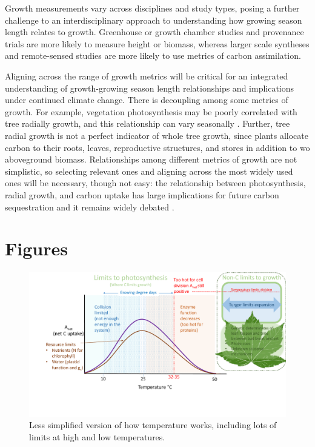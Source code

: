 \documentclass[11pt]{article}
\begin{document}
Growth measurements vary across disciplines and study types, posing a further challenge to an interdisciplinary approach to understanding how growing season length relates to growth. Greenhouse or growth chamber studies and provenance trials are more likely to measure height or biomass, whereas larger scale syntheses and remote-sensed studies are more likely to use metrics of carbon assimilation. 

Aligning across the range of growth metrics will be critical for an integrated understanding of growth-growing season length relationships and implications under continued climate change.  There is decoupling among some metrics of growth. For example, vegetation photosynthesis may be poorly correlated with tree radially growth, and this relationship can vary seasonally \citep{cabon2022cross}. Further, tree radial growth is not a perfect indicator of whole tree growth, since plants allocate
carbon to their roots, leaves, reproductive structures, and stores in addition to wo aboveground biomass. Relationships among different metrics of growth are not simplistic, so selecting relevant ones and aligning across the most widely used ones will be necessary, though not easy: the relationship  between photosynthesis, radial growth, and carbon uptake has large implications for future carbon sequestration and it remains widely debated \citep{green2022limits}.


\newpage
\section{Figures}
\begin{figure}[h!]
\includegraphics[width=1\textwidth]{..//figures/grephonfig.pdf}
\caption{Less simplified version of how temperature works, including lots of limits at high and low temperatures.}
\label{fig:temperaturecomplex}
\end{figure}
\end{document}

